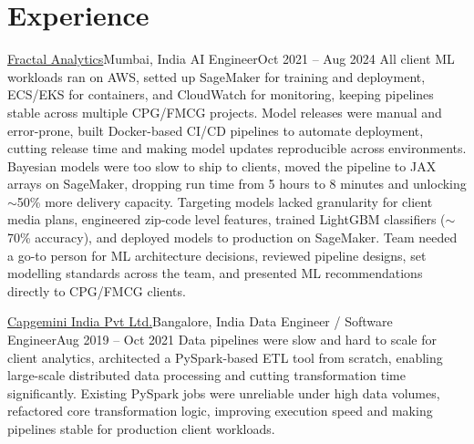\section{Experience}
\resumeSubHeadingListStart

\resumeSubheading
{\href{https://drive.google.com/file/d/10sMPuoBGO8S7p0PfTe7Hr_CULP5aWhup/view}{Fractal Analytics}}{Mumbai, India}
{AI Engineer}{Oct 2021 -- Aug 2024}
\resumeItemListStart
    {All client ML workloads ran on AWS, setted up SageMaker for training and deployment, ECS/EKS for containers, and CloudWatch for monitoring, keeping pipelines stable across multiple CPG/FMCG projects.}
    {Model releases were manual and error-prone, built Docker-based CI/CD pipelines to automate deployment, cutting release time and making model updates reproducible across environments.}
    {Bayesian models were too slow to ship to clients, moved the pipeline to JAX arrays on SageMaker, dropping run time from 5 hours to 8 minutes and unlocking $\sim$50\% more delivery capacity.}
    {Targeting models lacked granularity for client media plans, engineered zip-code level features, trained LightGBM classifiers ($\sim$70\% accuracy), and deployed models to production on SageMaker.}
    {Team needed a go-to person for ML architecture decisions, reviewed pipeline designs, set modelling standards across the team, and presented ML recommendations directly to CPG/FMCG clients.}
\resumeItemListEnd

\resumeSubheading
{\href{https://drive.google.com/file/d/1n0uYAw9foyXEYLjLYKpWT3szMy8oMVQK/view}{Capgemini India Pvt Ltd.}}{Bangalore, India}
{Data Engineer / Software Engineer}{Aug 2019 -- Oct 2021}
\resumeItemListStart
    {Data pipelines were slow and hard to scale for client analytics, architected a PySpark-based ETL tool from scratch, enabling large-scale distributed data processing and cutting transformation time significantly.}
    {Existing PySpark jobs were unreliable under high data volumes, refactored core transformation logic, improving execution speed and making pipelines stable   for production client workloads.}
\resumeItemListEnd

\resumeSubHeadingListEnd